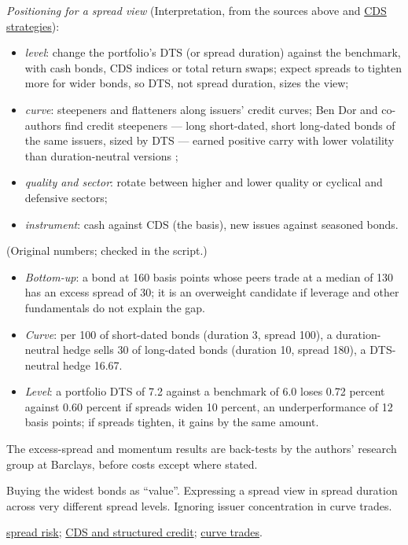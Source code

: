\begin{qfmethod}
\emph{Positioning for a spread view} (Interpretation, from the sources above and \hyperref[meth:cds-strategies]{CDS strategies}):
\begin{itemize}
\item \emph{level}: change the portfolio's DTS (or spread duration) against the benchmark, with cash bonds, CDS indices or total return swaps; expect spreads to tighten more for wider bonds, so DTS, not spread duration, sizes the view;
\item \emph{curve}: steepeners and flatteners along issuers' credit curves; Ben Dor and co-authors find credit steepeners --- long short-dated, short long-dated bonds of the same issuers, sized by DTS --- earned positive carry with lower volatility than duration-neutral versions \citep[pp.~213--214]{ben-dor-credit-portfolio-2012};
\item \emph{quality and sector}: rotate between higher and lower quality or cyclical and defensive sectors;
\item \emph{instrument}: cash against CDS (the basis), new issues against seasoned bonds.
\end{itemize}

 (Original numbers; checked in the script.)
\begin{itemize}
\item \emph{Bottom-up}: a bond at 160 basis points whose peers trade at a median of 130 has an excess spread of 30; it is an overweight candidate if leverage and other fundamentals do not explain the gap.
\item \emph{Curve}: per 100 of short-dated bonds (duration 3, spread 100), a duration-neutral hedge sells 30 of long-dated bonds (duration 10, spread 180), a DTS-neutral hedge 16.67.
\item \emph{Level}: a portfolio DTS of 7.2 against a benchmark of 6.0 loses 0.72 percent against 0.60 percent if spreads widen 10 percent, an underperformance of 12 basis points; if spreads tighten, it gains by the same amount.
\end{itemize}

 The excess-spread and momentum results are back-tests by the authors' research group at Barclays, before costs except where stated.

 Buying the widest bonds as ``value''. Expressing a spread view in spread duration across very different spread levels. Ignoring issuer concentration in curve trades.

 \hyperref[meth:credit-spread-portfolio-risk]{spread risk}; \hyperref[meth:credit-cds-international-structured]{CDS and structured credit}; \hyperref[meth:curve-trades-carry-rolldown]{curve trades}.

\end{qfmethod}

